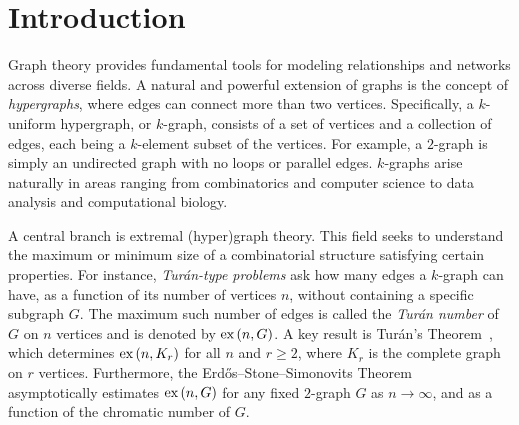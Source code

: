 \section{Introduction}\label{sec:introduction}

Graph theory provides fundamental tools for modeling relationships and networks across diverse fields.
A natural and powerful extension of graphs is the concept of \emph{hypergraphs},
where edges can connect more than two vertices.
Specifically, a $k$-uniform hypergraph, or $k$-graph,
consists of a set of vertices and a collection of edges, each being a $k$-element subset of the vertices.
For example, a $2$-graph is simply an undirected graph with no loops or parallel edges.
$k$-graphs arise naturally in areas ranging from combinatorics and computer science to data analysis and
computational biology.

A central branch is extremal (hyper)graph theory.
This field seeks to understand the maximum or minimum size of a combinatorial structure satisfying certain properties.
For instance, \emph{Turán-type problems} ask how many edges a $k$-graph can have, as a function of its number of vertices $n$,
without containing a specific subgraph $G$.
The maximum such number of edges is called the \emph{Turán number} of $G$ on $n$ vertices and is denoted by $\text{ex} \left( n, G \right)$.
A key result is Turán's Theorem~\cite{Turan1941},
which determines $\text{ex} \left( n, K_r \right)$ for all $n$ and $r \ge 2$, where $K_r$ is the complete graph on $r$ vertices.
Furthermore, the Erdős--Stone--Simonovits Theorem~\cite{erdos1946structure}
asymptotically estimates $\text{ex} \left( n, G \right)$ for any fixed $2$-graph $G$ as $n \to \infty$,
and as a function of the chromatic number of $G$.


